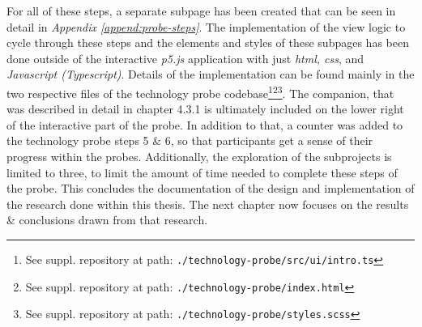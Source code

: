 For all of these steps, a separate subpage has been created that can be seen in detail in \textit{Appendix \ref{append:probe-steps}}. The implementation of the view logic to cycle through these steps and the elements and styles of these subpages has been done outside of the interactive \textit{p5.js} application with just \textit{\gls{html}, \gls{css}}, and \textit{Javascript (Typescript)}. Details of the implementation can be found mainly in the two respective files of the technology probe codebase\footnote{See suppl. repository at path: \texttt{./technology-probe/src/ui/intro.ts}}\footnote{See suppl. repository at path: \texttt{./technology-probe/index.html}}\footnote{See suppl. repository at path: \texttt{./technology-probe/styles.scss}}. The companion, that was described in detail in chapter 4.3.1 is ultimately included on the lower right of the interactive part of the probe. In addition to that, a counter was added to the technology probe steps 5 \& 6, so that participants get a sense of their progress within the probes. Additionally, the exploration of the subprojects is limited to three, to limit the amount of time needed to complete these steps of the probe. This concludes the documentation of the design and implementation of the research done within this thesis. The next chapter now focuses on the results \& conclusions drawn from that research.
